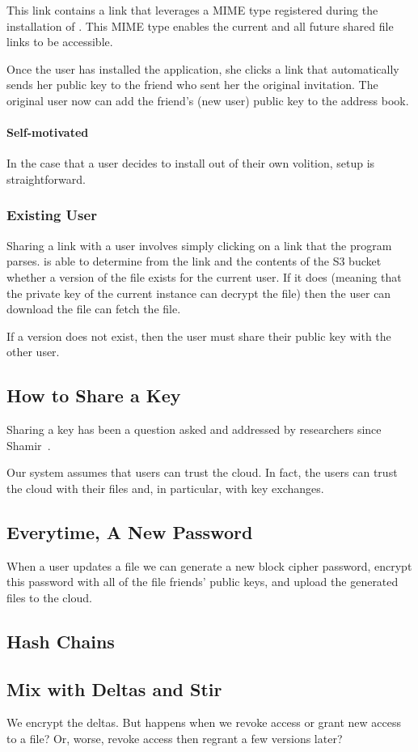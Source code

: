 This link contains a link that leverages a MIME type registered during
the installation of \name. This MIME type enables the current and all
future shared file links to be accessible.

Once the user has installed the application, she clicks a link that
automatically sends her public key to the friend who sent her the
original invitation. The original user now can add the friend's (new
\name user) public key to the \name address book.

\paragraph{Self-motivated} In the case that a user decides to install
\name out of their own volition, setup is straightforward.

\subsubsection*{Existing \name User}

Sharing a link with a user involves simply clicking on a link that the
\name program parses. \name is able to determine from the link and the
contents of the S3 bucket whether a version of the file exists for the
current user. If it does (meaning that the private key of the current
\name instance can decrypt the file) then the user can download the
file can fetch the file. 

If a version does not exist, then the user must share their public key
with the other user.

\subsection{How to Share a Key}

Sharing a key has been a question asked and addressed by researchers
since Shamir~\cite{shamir}.

Our system assumes that users can trust the cloud. In fact, the users
can trust the cloud with their files and, in particular, with key
exchanges.

\subsection{Everytime, A New Password}

When a user updates a file we can generate a new block cipher
password, encrypt this password with all of the file friends' public
keys, and upload the generated files to the cloud.

\subsection{Hash Chains}


\subsection{Mix with Deltas and Stir}

We encrypt the deltas. But happens when we revoke access or grant new
access to a file? Or, worse, revoke access then regrant a few versions
later?